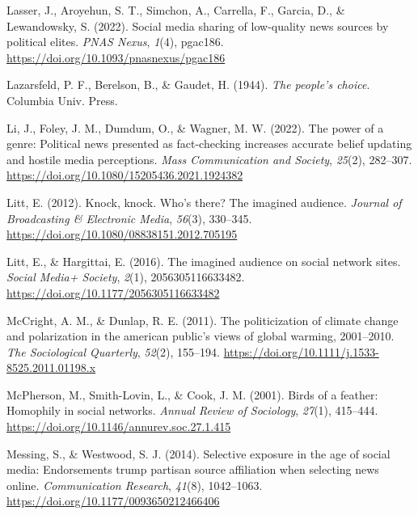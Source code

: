 \documentclass[
  12pt,
]{article}
\newlength{\cslhangindent}
\newlength{\cslentryspacingunit} %
\newenvironment{CSLReferences}[2] %
 {%
  \setlength{\parindent}{0pt}
  \ifodd #1
  \let\oldpar\par
  \def\par{\hangindent=\cslhangindent\oldpar}
  \fi
  \setlength{\parskip}{#2\cslentryspacingunit}
 }%
 {}
\begin{document}
\begin{CSLReferences}{1}{0}
\leavevmode{}%
Lasser, J., Aroyehun, S. T., Simchon, A., Carrella, F., Garcia, D., \&
Lewandowsky, S. (2022). Social media sharing of low-quality news sources
by political elites. \emph{PNAS Nexus}, \emph{1}(4), pgac186.
\url{https://doi.org/10.1093/pnasnexus/pgac186}

\leavevmode{}%
Lazarsfeld, P. F., Berelson, B., \& Gaudet, H. (1944). \emph{The
people's choice}. Columbia Univ. Press.

\leavevmode{}%
Li, J., Foley, J. M., Dumdum, O., \& Wagner, M. W. (2022). The power of
a genre: Political news presented as fact-checking increases accurate
belief updating and hostile media perceptions. \emph{Mass Communication
and Society}, \emph{25}(2), 282--307.
\url{https://doi.org/10.1080/15205436.2021.1924382}

\leavevmode{}%
Litt, E. (2012). Knock, knock. Who's there? The imagined audience.
\emph{Journal of Broadcasting \& Electronic Media}, \emph{56}(3),
330--345. \url{https://doi.org/10.1080/08838151.2012.705195}

\leavevmode{}%
Litt, E., \& Hargittai, E. (2016). The imagined audience on social
network sites. \emph{Social Media+ Society}, \emph{2}(1),
2056305116633482. \url{https://doi.org/10.1177/2056305116633482}

\leavevmode{}%
McCright, A. M., \& Dunlap, R. E. (2011). The politicization of climate
change and polarization in the american public's views of global
warming, 2001--2010. \emph{The Sociological Quarterly}, \emph{52}(2),
155--194. \url{https://doi.org/10.1111/j.1533-8525.2011.01198.x}

\leavevmode{}%
McPherson, M., Smith-Lovin, L., \& Cook, J. M. (2001). Birds of a
feather: Homophily in social networks. \emph{Annual Review of
Sociology}, \emph{27}(1), 415--444.
\url{https://doi.org/10.1146/annurev.soc.27.1.415}

\leavevmode{}%
Messing, S., \& Westwood, S. J. (2014). Selective exposure in the age of
social media: Endorsements trump partisan source affiliation when
selecting news online. \emph{Communication Research}, \emph{41}(8),
1042--1063. \url{https://doi.org/10.1177/0093650212466406}


\end{CSLReferences}
\end{document}
